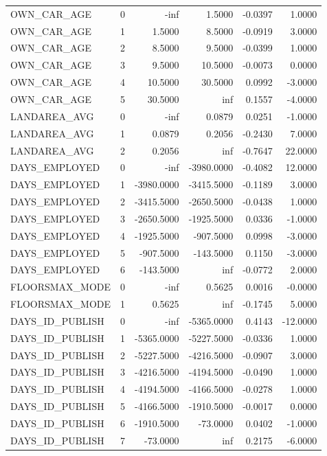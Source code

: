 \begin{tabular}{lrrrrr}
OWN_CAR_AGE & 0 & -inf & 1.5000 & -0.0397 & 1.0000 \\
OWN_CAR_AGE & 1 & 1.5000 & 8.5000 & -0.0919 & 3.0000 \\
OWN_CAR_AGE & 2 & 8.5000 & 9.5000 & -0.0399 & 1.0000 \\
OWN_CAR_AGE & 3 & 9.5000 & 10.5000 & -0.0073 & 0.0000 \\
OWN_CAR_AGE & 4 & 10.5000 & 30.5000 & 0.0992 & -3.0000 \\
OWN_CAR_AGE & 5 & 30.5000 & inf & 0.1557 & -4.0000 \\
LANDAREA_AVG & 0 & -inf & 0.0879 & 0.0251 & -1.0000 \\
LANDAREA_AVG & 1 & 0.0879 & 0.2056 & -0.2430 & 7.0000 \\
LANDAREA_AVG & 2 & 0.2056 & inf & -0.7647 & 22.0000 \\
DAYS_EMPLOYED & 0 & -inf & -3980.0000 & -0.4082 & 12.0000 \\
DAYS_EMPLOYED & 1 & -3980.0000 & -3415.5000 & -0.1189 & 3.0000 \\
DAYS_EMPLOYED & 2 & -3415.5000 & -2650.5000 & -0.0438 & 1.0000 \\
DAYS_EMPLOYED & 3 & -2650.5000 & -1925.5000 & 0.0336 & -1.0000 \\
DAYS_EMPLOYED & 4 & -1925.5000 & -907.5000 & 0.0998 & -3.0000 \\
DAYS_EMPLOYED & 5 & -907.5000 & -143.5000 & 0.1150 & -3.0000 \\
DAYS_EMPLOYED & 6 & -143.5000 & inf & -0.0772 & 2.0000 \\
FLOORSMAX_MODE & 0 & -inf & 0.5625 & 0.0016 & -0.0000 \\
FLOORSMAX_MODE & 1 & 0.5625 & inf & -0.1745 & 5.0000 \\
DAYS_ID_PUBLISH & 0 & -inf & -5365.0000 & 0.4143 & -12.0000 \\
DAYS_ID_PUBLISH & 1 & -5365.0000 & -5227.5000 & -0.0336 & 1.0000 \\
DAYS_ID_PUBLISH & 2 & -5227.5000 & -4216.5000 & -0.0907 & 3.0000 \\
DAYS_ID_PUBLISH & 3 & -4216.5000 & -4194.5000 & -0.0490 & 1.0000 \\
DAYS_ID_PUBLISH & 4 & -4194.5000 & -4166.5000 & -0.0278 & 1.0000 \\
DAYS_ID_PUBLISH & 5 & -4166.5000 & -1910.5000 & -0.0017 & 0.0000 \\
DAYS_ID_PUBLISH & 6 & -1910.5000 & -73.0000 & 0.0402 & -1.0000 \\
DAYS_ID_PUBLISH & 7 & -73.0000 & inf & 0.2175 & -6.0000 \\

\end{tabular}
